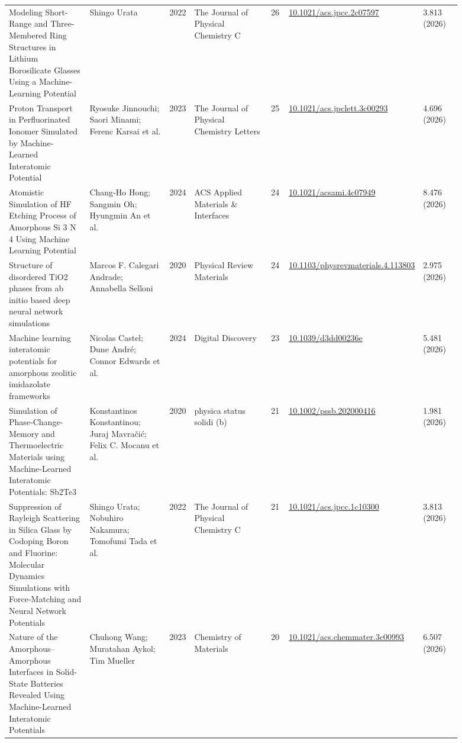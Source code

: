 \documentclass[10pt,a4paper]{article}
\begin{document}
{\begin{longtable}{p{0.192\linewidth}p{0.192\linewidth}p{0.043\linewidth}p{0.192\linewidth}p{0.043\linewidth}p{0.132\linewidth}p{0.096\linewidth}}
Modeling Short-Range and Three-Membered Ring Structures in Lithium Borosilicate Glasses Using a Machine-Learning Potential & Shingo Urata & 2022 & The Journal of Physical Chemistry C & 26 & \href{https://doi.org/10.1021/acs.jpcc.2c07597}{10.1021/acs.jpcc.2c07597} & 3.813 (2026) \\
Proton Transport in Perfluorinated Ionomer Simulated by Machine-Learned Interatomic Potential & Ryosuke Jinnouchi; Saori Minami; Ferenc Karsai et al. & 2023 & The Journal of Physical Chemistry Letters & 25 & \href{https://doi.org/10.1021/acs.jpclett.3c00293}{10.1021/acs.jpclett.3c00293} & 4.696 (2026) \\
Atomistic Simulation of HF Etching Process of Amorphous Si 3 N 4 Using Machine Learning Potential & Chang‐Ho Hong; Sangmin Oh; Hyungmin An et al. & 2024 & ACS Applied Materials \& Interfaces & 24 & \href{https://doi.org/10.1021/acsami.4c07949}{10.1021/acsami.4c07949} & 8.476 (2026) \\
Structure of disordered TiO2 phases from ab initio based deep neural network simulations & Marcos F. Calegari Andrade; Annabella Selloni & 2020 & Physical Review Materials & 24 & \href{https://doi.org/10.1103/physrevmaterials.4.113803}{10.1103/physrevmaterials.4.113803} & 2.975 (2026) \\
Machine learning interatomic potentials for amorphous zeolitic imidazolate frameworks & Nicolas Castel; Dune André; Connor Edwards et al. & 2024 & Digital Discovery & 23 & \href{https://doi.org/10.1039/d3dd00236e}{10.1039/d3dd00236e} & 5.481 (2026) \\
Simulation of Phase‐Change‐Memory and Thermoelectric Materials using Machine‐Learned Interatomic Potentials: Sb2Te3 & Konstantinos Konstantinou; Juraj Mavračić; Felix C. Mocanu et al. & 2020 & physica status solidi (b) & 21 & \href{https://doi.org/10.1002/pssb.202000416}{10.1002/pssb.202000416} & 1.981 (2026) \\
Suppression of Rayleigh Scattering in Silica Glass by Codoping Boron and Fluorine: Molecular Dynamics Simulations with Force-Matching and Neural Network Potentials & Shingo Urata; Nobuhiro Nakamura; Tomofumi Tada et al. & 2022 & The Journal of Physical Chemistry C & 21 & \href{https://doi.org/10.1021/acs.jpcc.1c10300}{10.1021/acs.jpcc.1c10300} & 3.813 (2026) \\
Nature of the Amorphous–Amorphous Interfaces in Solid-State Batteries Revealed Using Machine-Learned Interatomic Potentials & Chuhong Wang; Muratahan Aykol; Tim Mueller & 2023 & Chemistry of Materials & 20 & \href{https://doi.org/10.1021/acs.chemmater.3c00993}{10.1021/acs.chemmater.3c00993} & 6.507 (2026) \\

\end{longtable}}
\end{document}
